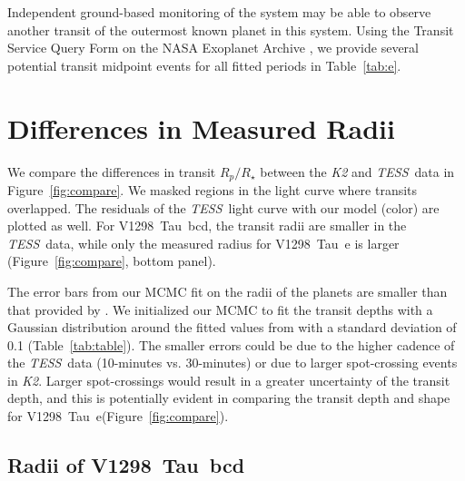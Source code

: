 \documentclass[twocolumn]{aastex631}
\newcommand{\tess}{\textit{TESS}}
\newcommand{\planete}{V1298~Tau~e\xspace}
\newcommand{\planetknown}{V1298~Tau~bcd\xspace}
\begin{document}
Independent ground-based monitoring of the system may be able to observe another transit of the outermost known planet in this system. Using the Transit Service Query Form on the NASA Exoplanet Archive \citep{Akeson2013}, we provide several potential transit midpoint events for all fitted periods in Table~\ref{tab:e}.

\section{Differences in Measured Radii} \label{sec:radii}

We compare the differences in transit $R_p/R_\star$ between the \textit{K2} and \tess\ data in Figure~\ref{fig:compare}. We masked regions in the light curve where transits overlapped. The residuals of the \tess\ light curve with our model (color) are plotted as well. For \planetknown, the transit radii are smaller in the \tess\ data, while only the measured radius for \planete is larger (Figure~\ref{fig:compare}, bottom panel).

The error bars from our MCMC fit on the radii of the planets are smaller than that provided by \cite{David2019b}. We initialized our MCMC to fit the transit depths with a Gaussian distribution around the fitted values from \cite{David2019b} with a standard deviation of 0.1 (Table~\ref{tab:table}). The smaller errors could be due to the higher cadence of the \tess\ data (10-minutes vs. 30-minutes) or due to larger spot-crossing events in \textit{K2}. Larger spot-crossings would result in a greater uncertainty of the transit depth, and this is potentially evident in comparing the transit depth and shape for \planete (Figure~\ref{fig:compare}).


\subsection{Radii of \planetknown}
\end{document}
